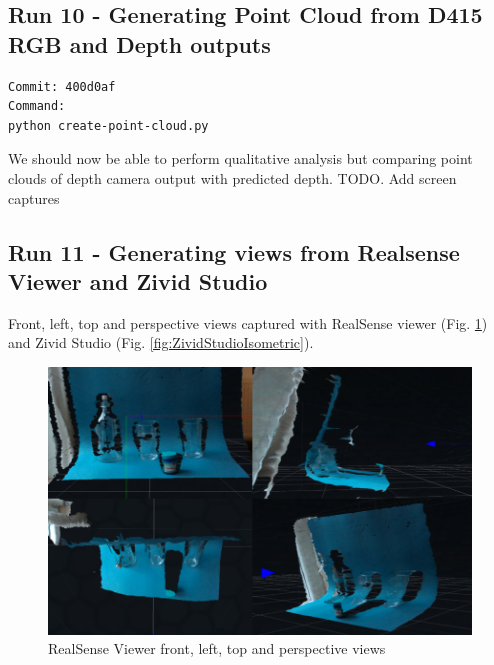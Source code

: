 \subsection{Run 10 -  Generating Point Cloud from D415 RGB and Depth outputs}
\label{app_res:10}
\begin{verbatim}
Commit: 400d0af
Command: 
python create-point-cloud.py
\end{verbatim}
We should now be able to perform qualitative analysis but comparing point clouds of depth camera output with predicted depth.
TODO. Add screen captures

\subsection{Run 11 -  Generating views from Realsense Viewer and Zivid Studio}
\label{app_res:11}

Front, left, top and perspective views captured with RealSense viewer (Fig. \ref{fig:RealsenseViewerIsometric}) and Zivid Studio (Fig. \ref{fig:ZividStudioIsometric}).

\begin{figure}[h!]
\centering
\includegraphics[width=\textwidth]{Figures/RealsenseViewerIsometric.png}
\caption{RealSense Viewer front, left, top and perspective views}
\label{fig:RealsenseViewerIsometric}
\end{figure}

